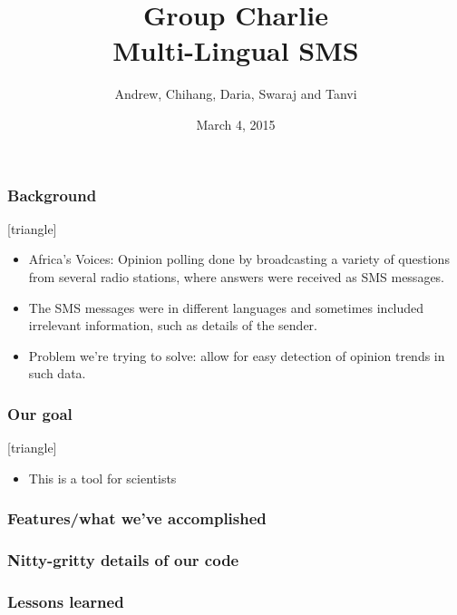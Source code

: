 \documentclass{beamer}
\title[Group Charlie --- Multi-Lingual SMS]{Group Charlie\\Multi-Lingual SMS}
\author[aw625, chw43, did23, sd660, tsp31]{Andrew, Chihang, Daria, Swaraj and Tanvi}
\institute[]{University of Cambridge}
\date{March 4, 2015}
\begin{document}
\maketitle

\begin{frame}
\frametitle{Background}
[triangle]
\begin{itemize}[<+->]
\item Africa's Voices: Opinion polling done by broadcasting a variety of questions from several radio stations, where answers were received as SMS messages.
\item The SMS messages were in different languages and sometimes included irrelevant information, such as details of the sender.
\item Problem we're trying to solve: allow for easy detection of opinion trends in such data.
\end{itemize}
\end{frame}

\begin{frame}
\frametitle{Our goal}
[triangle]
\begin{itemize}[<+->]
\item This is a tool for scientists
\end{itemize}
\end{frame}

\begin{frame}
\frametitle{Features/what we've accomplished}
\end{frame}

\begin{frame}
\frametitle{Nitty-gritty details of our code}
\end{frame}

\begin{frame}
\frametitle{Lessons learned}
\end{frame}
\end{document}
